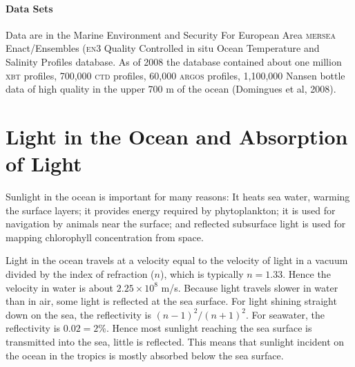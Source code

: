 \paragraph{Data Sets}
Data are in the Marine Environment and Security For European Area
\textsc{mersea} Enact/Ensembles (\textsc{en}3 Quality Controlled in
situ Ocean Temperature and Salinity Profiles database. As of 2008 the
database contained about one million \textsc{xbt} profiles, 700,000
\textsc{ctd} profiles, 60,000 \textsc{argos} profiles, 1,100,000
Nansen bottle data of high quality in the upper 700 m of the ocean
(Domingues et al, 2008).

\section{Light in the Ocean and Absorption of Light}
Sunlight in the ocean is
important for many reasons: It heats sea water, warming the surface
layers; it provides energy required by phytoplankton; it is used for
navigation by animals near the surface; and reflected subsurface light
is used for mapping chlorophyll concentration from space.

Light in the ocean travels at a velocity equal to the velocity of
light in a vacuum divided by the index of refraction ($n$), which is
typically $n = 1.33$.  Hence the velocity in water is about $2.25
\times 10^8$ m/s. Because light travels slower in water than in air,
some light is reflected at the sea surface.  For light shining
straight down on the sea, the reflectivity is $(n - 1)^2 /(n + 1)^2$.
For seawater, the reflectivity is $0.02 = 2$\%. Hence most sunlight
reaching the sea surface is transmitted into the sea, little is
reflected. This means that sunlight incident on the ocean in the
tropics is mostly absorbed below the sea surface.

